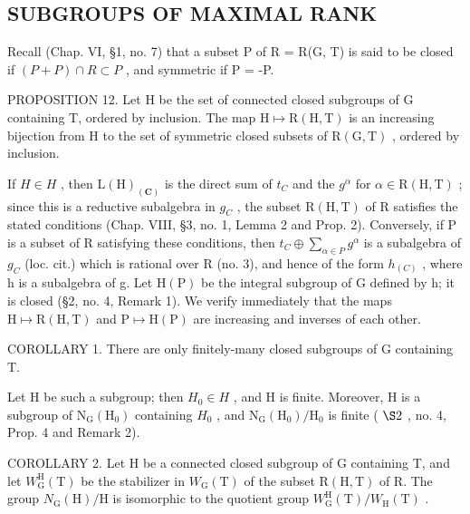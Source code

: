 \subsection{SUBGROUPS OF MAXIMAL RANK}

Recall (Chap. VI, §1, no. 7) that a subset P of R = R(G, T) is said to be closed if \((P + P) \cap R \subset P\) , and symmetric if P = -P.

PROPOSITION 12. Let H be the set of connected closed subgroups of G containing T, ordered by inclusion. The map \(\mathrm{H} \mapsto \mathrm{R}(\mathrm{H}, \mathrm{T})\) is an increasing bijection from H to the set of symmetric closed subsets of \(\mathrm{R}(\mathrm{G}, \mathrm{T})\) , ordered by inclusion.

If \(H \in H\) , then \(\mathrm{L}(\mathrm{H})_{(\mathbf{C})}\) is the direct sum of \(t_{C}\) and the \(g^{\alpha}\) for \(\alpha \in \mathrm{R}(\mathrm{H}, \mathrm{T})\) ; since this is a reductive subalgebra in \(g_{C}\) , the subset \(\mathrm{R}(\mathrm{H}, \mathrm{T})\) of R satisfies the stated conditions (Chap. VIII, §3, no. 1, Lemma 2 and Prop. 2). Conversely, if P is a subset of R satisfying these conditions, then \(t_{C} \oplus \sum_{\alpha \in P} g^{\alpha}\) is a subalgebra of \(g_{C}\) (loc. cit.) which is rational over R (no. 3), and hence of the form \(h_{(C)}\) , where h is a subalgebra of g. Let \(\mathrm{H}(\mathrm{P})\) be the integral subgroup of G defined by h; it is closed (§2, no. 4, Remark 1). We verify immediately that the maps \(\mathrm{H} \mapsto \mathrm{R}(\mathrm{H}, \mathrm{T})\) and \(\mathrm{P} \mapsto \mathrm{H}(\mathrm{P})\) are increasing and inverses of each other.

COROLLARY 1. There are only finitely-many closed subgroups of G containing T.

Let H be such a subgroup; then \(H_{0} \in H\) , and H is finite. Moreover, H is a subgroup of \(\mathrm{N}_{\mathrm{G}}(\mathrm{H}_{0})\) containing \(H_{0}\) , and \(\mathrm{N}_{\mathrm{G}}(\mathrm{H}_{0})/\mathrm{H}_{0}\) is finite ( \(\S2\) , no. 4, Prop. 4 and Remark 2).

COROLLARY 2. Let H be a connected closed subgroup of G containing T, and let \(W_{\mathrm{G}}^{\mathrm{H}}(\mathrm{T})\) be the stabilizer in \(W_{\mathrm{G}}(\mathrm{T})\) of the subset \(\mathrm{R}(\mathrm{H},\mathrm{T})\) of R. The group \(N_{\mathrm{G}}(\mathrm{H})/\mathrm{H}\) is isomorphic to the quotient group \(W_{\mathrm{G}}^{\mathrm{H}}(\mathrm{T})/W_{\mathrm{H}}(\mathrm{T})\) .

